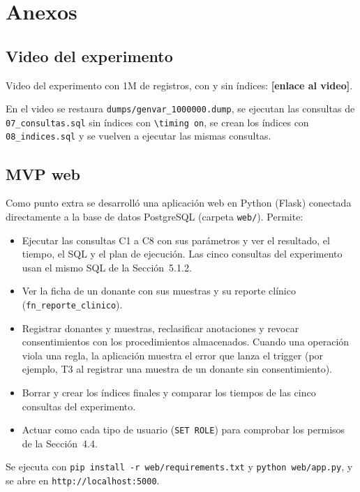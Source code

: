 \section{Anexos}

\subsection{Video del experimento}

Video del experimento con 1M de registros, con y sin índices: \textbf{[enlace al video]}.

En el video se restaura \texttt{dumps/genvar\_\allowbreak{}1000000.dump}, se ejecutan las consultas de \texttt{07\_\allowbreak{}consultas.sql}
sin índices con \texttt{\textbackslash timing on}, se crean los índices con \texttt{08\_\allowbreak{}indices.sql} y se vuelven a
ejecutar las mismas consultas.

\subsection{MVP web}

Como punto extra se desarrolló una aplicación web en Python (Flask) conectada directamente a la base de datos
PostgreSQL (carpeta \texttt{web/}). Permite:

\begin{itemize}
  \item Ejecutar las consultas C1 a C8 con sus parámetros y ver el resultado, el tiempo, el SQL y el plan de ejecución.
        Las cinco consultas del experimento usan el mismo SQL de la Sección~5.1.2.
  \item Ver la ficha de un donante con sus muestras y su reporte clínico (\texttt{fn\_\allowbreak{}reporte\_\allowbreak{}clinico}).
  \item Registrar donantes y muestras, reclasificar anotaciones y revocar consentimientos con los procedimientos
        almacenados. Cuando una operación viola una regla, la aplicación muestra el error que lanza el trigger
        (por ejemplo, T3 al registrar una muestra de un donante sin consentimiento).
  \item Borrar y crear los índices finales y comparar los tiempos de las cinco consultas del experimento.
  \item Actuar como cada tipo de usuario (\texttt{SET ROLE}) para comprobar los permisos de la Sección~4.4.
\end{itemize}

Se ejecuta con \texttt{pip install -r web/requirements.txt} y \texttt{python web/app.py}, y se abre en
\texttt{http://localhost:5000}.


